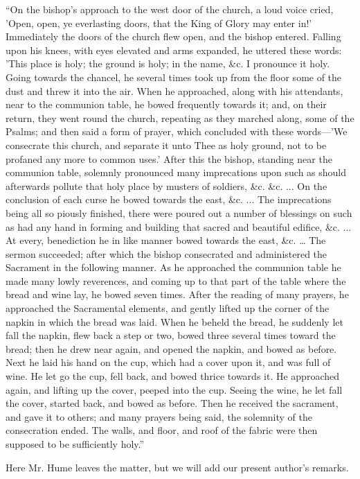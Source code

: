 ``On the bishop's approach to the
west door of the church, a loud voice cried, 'Open, open, ye everlasting
doors, that the King of Glory may enter in!' Immediately the doors of
the church flew open, and the bishop entered. Falling upon his knees,
with eyes elevated and arms expanded, he uttered these words: 'This
place is holy; the ground is holy; in the name, \&c. I pronounce it
holy. Going towards the chancel, he several times took up from the floor
some of the dust and threw it into the air. When he approached, along
with his attendants, near to the communion table, he bowed frequently
towards it; and, on their return, they went round the church, repeating
as they marched along, some of the Psalms; and then said a form of
prayer, which concluded with these words—'We consecrate this church,
and separate it unto Thee as holy ground, not to be profaned any more to
common uses.' After this the bishop, standing near the communion table,
solemnly pronounced many imprecations upon such as should afterwards
pollute that holy place by musters of soldiers, \&c. \&c. ... On
the conclusion of each curse he bowed towards the east, \&c. ... The
imprecations being all so piously finished, there were poured out a
number of blessings on such as had any hand in forming and building that
sacred and beautiful edifice, \&c. ... At every, benediction he in
like manner bowed towards the east, \&c. … The sermon succeeded;
after which the bishop consecrated and administered the Sacrament in the
following manner. As he approached the communion table he made many
lowly reverences, and coming up to that part of the table where the
bread and wine lay, he bowed seven times. After the reading of many
prayers, he approached the Sacramental elements, and gently lifted up
the corner of the napkin in which the bread was laid. When he beheld the
bread, he suddenly let fall the napkin, flew back a step or two, bowed
three several times toward the bread; then he drew near again, and
opened the napkin, and bowed as before. Next he laid his hand on the
cup, which had a cover upon it, and was full of wine. He let go the cup,
fell back, and bowed thrice towards it. He approached again, and lifting
up the cover, peeped into the cup. Seeing the wine, he let fall the
cover, started back, and bowed as before. Then he received the
sacrament, and gave it to others; and many prayers being said, the
solemnity of the consecration ended. The walls, and floor, and roof of
the fabric were then supposed to be sufficiently holy.''

Here Mr. Hume leaves the matter, but we will add
our present author's remarks.

